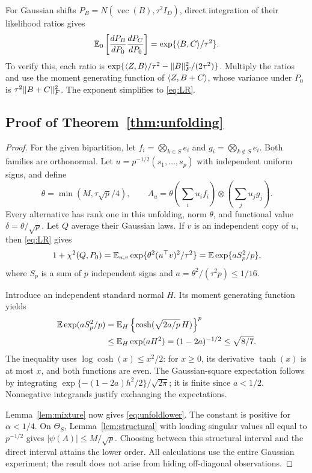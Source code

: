 For Gaussian shifts $P_B=N(\operatorname{vec}(B),\tau^2I_D)$, direct integration of their likelihood ratios gives
\begin{equation}\label{eq:LR}
 \mathbb E_0\left[\frac{dP_B}{dP_0}\frac{dP_C}{dP_0}\right]
 =\exp\{\langle B,C\rangle/\tau^2\}.
\end{equation}
To verify this, each ratio is $\exp\{\langle Z,B\rangle/\tau^2-\lVert B\rVert_F^2/(2\tau^2)\}$. Multiply the ratios and use the moment generating function of $\langle Z,B+C\rangle$, whose variance under $P_0$ is $\tau^2\lVert B+C\rVert_F^2$. The exponent simplifies to \eqref{eq:LR}.

\subsection{Proof of Theorem~\ref{thm:unfolding}}

\begin{proof}
For the given bipartition, let $f_i=\bigotimes_{k\in S}e_i$ and $g_i=\bigotimes_{k\notin S}e_i$. Both families are orthonormal. Let $u=p^{-1/2}(s_1,\ldots,s_p)$ with independent uniform signs, and define
\[
 \theta=\min(M,\tau\sqrt p/4),\qquad
 A_u=\theta\left(\sum_i u_i f_i\right)\otimes
                    \left(\sum_j u_j g_j\right).
\]
Every alternative has rank one in this unfolding, norm $\theta$, and functional value $\delta=\theta/\sqrt p$. Let $Q$ average their Gaussian laws. If $v$ is an independent copy of $u$, then \eqref{eq:LR} gives
\[
 1+\chi^2(Q,P_0)=\mathbb E_{u,v}\exp\{\theta^2(u^\top v)^2/\tau^2\}
 =\mathbb E\exp\{a S_p^2/p\},
\]
where $S_p$ is a sum of $p$ independent signs and $a=\theta^2/(\tau^2p)\le1/16$.

Introduce an independent standard normal $H$. Its moment generating function yields
\begin{align*}
 \mathbb E\exp(aS_p^2/p)
 &=\mathbb E_H\left\{\cosh(\sqrt{2a/p}\,H)\right\}^p\\
 &\le\mathbb E_H\exp(aH^2)=(1-2a)^{-1/2}\le\sqrt{8/7}.
\end{align*}
The inequality uses $\log\cosh(x)\le x^2/2$: for $x\ge0$, its derivative $\tanh(x)$ is at most $x$, and both functions are even. The Gaussian-square expectation follows by integrating $\exp\{-(1-2a)h^2/2\}/\sqrt{2\pi}$; it is finite since $a<1/2$. Nonnegative integrands justify exchanging the expectations.

Lemma~\ref{lem:mixture} now gives \eqref{eq:unfoldlower}. The constant is positive for $\alpha<1/4$. On $\Theta_S$, Lemma~\ref{lem:structural} with loading singular values all equal to $p^{-1/2}$ gives $|\psi(A)|\le M/\sqrt p$. Choosing between this structural interval and the direct interval attains the lower order. All calculations use the entire Gaussian experiment; the result does not arise from hiding off-diagonal observations.
\end{proof}

